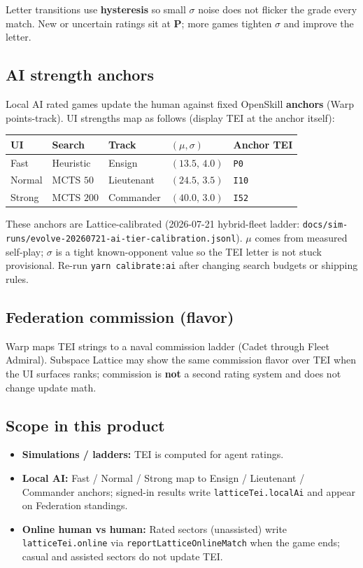 \documentclass[11pt,a4paper]{article}
\begin{document}
Letter transitions use \textbf{hysteresis} so small $\sigma$ noise does
not flicker the grade every match. New or uncertain ratings sit at
\textbf{P}; more games tighten $\sigma$ and improve the letter.

\subsection{AI strength anchors}

Local AI rated games update the human against fixed OpenSkill \textbf{anchors}
(Warp points-track). UI strengths map as follows (display TEI at the
anchor itself):

\begin{center}
\begin{tabular}{@{}lllll@{}}
\toprule
\textbf{UI} & \textbf{Search} & \textbf{Track} & $(\mu,\sigma)$ & \textbf{Anchor TEI} \\
\midrule
Fast & Heuristic & Ensign & $(13.5,\,4.0)$ & \texttt{P0} \\
Normal & MCTS $50$ & Lieutenant & $(24.5,\,3.5)$ & \texttt{I10} \\
Strong & MCTS $200$ & Commander & $(40.0,\,3.0)$ & \texttt{I52} \\
\bottomrule
\end{tabular}
\end{center}

These anchors are Lattice-calibrated (2026-07-21 hybrid-fleet ladder:
\texttt{docs/sim-runs/evolve-20260721-ai-tier-calibration.jsonl}).
$\mu$ comes from measured self-play; $\sigma$ is a tight known-opponent
value so the TEI letter is not stuck provisional. Re-run
\texttt{yarn calibrate:ai} after changing search budgets or shipping rules.

\subsection{Federation commission (flavor)}

Warp maps TEI strings to a naval commission ladder (Cadet through Fleet
Admiral). Subspace Lattice may show the same commission flavor over TEI
when the UI surfaces ranks; commission is \textbf{not} a second rating
system and does not change update math.

\subsection{Scope in this product}

\begin{itemize}[leftmargin=*]
  \item \textbf{Simulations / ladders:} TEI is computed for agent ratings.
  \item \textbf{Local AI:} Fast / Normal / Strong map to Ensign /
        Lieutenant / Commander anchors; signed-in results write
        \texttt{latticeTei.localAi} and appear on Federation standings.
  \item \textbf{Online human vs human:} Rated sectors (unassisted) write
        \texttt{latticeTei.online} via \texttt{reportLatticeOnlineMatch}
        when the game ends; casual and assisted sectors do not update TEI.
\end{itemize}
\end{document}
